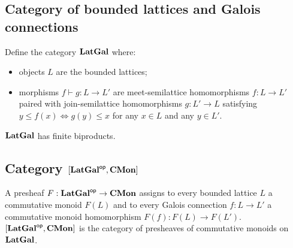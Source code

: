 \subsection{Category of bounded lattices and Galois connections}

Define the category $\mathbf{LatGal}$ where:
\begin{itemize}
\item objects $L$ are the bounded lattices;
\item morphisms $f \vdash g: L \to L'$ are meet-semilattice homomorphisms $f: L \to L'$ paired with
join-semilattice homomorphisms $g: L' \to L$ satisfying $y \leq f(x) \iff g(y) \leq x$ for any $x \in L$ and any
$y \in L'$.
\end{itemize}

\noindent $\mathbf{LatGal}$ has finite biproducts.

\subsection{Category $[\mathbf{LatGal}^{\mathsf{op}},\mathbf{CMon}]$}

A presheaf $F: \mathbf{LatGal}^{\mathsf{op}} \to \mathbf{CMon}$ assigns to every bounded lattice $L$ a commutative monoid $F(L)$ and to
every Galois connection $f: L \to L'$ a commutative monoid homomorphism $F(f): F(L) \to F(L')$.
$[\mathbf{LatGal}^{\mathsf{op}},\mathbf{CMon}]$ is the category of presheaves of commutative monoids on $\mathbf{LatGal}$.
